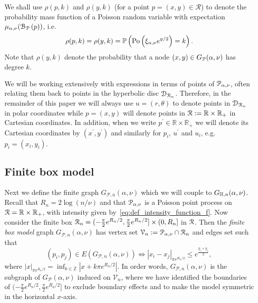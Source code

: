 We shall use $\rho(p,k)$ and $\rho(y,k)$ (for a point $p=(x,y) \in \mathcal{R}$) to denote the probability mass function of a Poisson random variable with expectation $\mu_{\alpha, \nu}({\mathcal B}_{{\mathcal P}}\left(p\right))$, i.e.
\[
	\rho(p,k) = \rho(y,k) = \mathbb{P}\left({\mathrm{Po}}\left(\xi_{\alpha,\nu} e^{y/2}\right) = k\right).
\]
Note that $\rho(y,k)$ denote the probability that a node $(x,y) \in G_{{\mathcal P}}(\alpha,\nu)$ has degree $k$.

\begin{remark}\label{rmk:point_notation}
We will be working extensively with expressions in terms of points of ${\mathcal P}_{\alpha, \nu}$, often relating them back to points in the hyperbolic disc ${\mathcal D}_{{\mathcal R}_n}$. Therefore, in the remainder of this paper we will always use $u = (r,\theta)$ to denote points in ${\mathcal D}_{{\mathcal R}_n}$ in polar coordinates while $p = (x,y)$ will denote points in ${\mathcal R} := \mathbb{R} \times \mathbb{R}_+$ in Cartesian coordinates. In addition, when we write $p^\prime \in \mathbb{R} \times \mathbb{R}_+$ we will denote its Cartesian coordinates by $(x^\prime, y^\prime)$ and similarly for $p_i$, $u^\prime$ and $u_i$, e.g. $p_i = (x_i, y_i)$.
\end{remark}


\subsection{Finite box model}
 
Next we define the finite graph $G_{\mathcal{P},n}(\alpha, \nu)$ which we will couple to $G_{\mathbb{H}, n}(\alpha, \nu)$. Recall that $R_n = 2\log(n/\nu)$ and that ${\mathcal P}_{\alpha, \nu}$ is a Poisson point process on ${\mathcal R} = {\mathbb R} \times {\ensuremath{\mathbb R}}_+$, with intensity given by~\eqref{eq:def_intensity_function_f}. Now consider the finite box ${\mathcal R}_n = (-\frac{\pi}{2}e^{R_n/2}, \frac{\pi}{2}e^{R_n/2}] \times (0, R_n]$ in ${\mathcal R}$. Then the \emph{finite box model} graph $G_{\mathcal{P},n}(\alpha, \nu)$ has vertex set $\mathcal{V}_n := \mathcal{P}_{\alpha, \nu} \cap {\mathcal R}_n$ and edges set such that
\[
	(p_i, p_j) \in E(G_{\mathcal{P},n}(\alpha, \nu)) \iff |x_i - x_j|_{\pi e^{R_n/2}} \leq e^{\frac{y_i + y_j}{2}},
\]
where $|x|_{\pi e^{R_n/2}} = \inf_{k \in \mathbb{Z}} |x + k \pi e^{R_n/2}|$. In order words, $G_{\mathcal{P},n}(\alpha, \nu)$ is the subgraph of $G_{\mathcal{P}}(\alpha, \nu)$ induced on $\mathcal{V}_n$, where we have identified the boundaries of $(-\frac{\pi}{2}e^{R_n/2}, \frac{\pi}{2}e^{R_n/2}]$ to exclude boundary effects and to make the model symmetric in the horizontal $x$-axis. 

